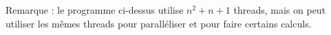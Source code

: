 \begin{exercice}[Parallélisation]
\begin{corrections}
    Remarque : le programme ci-dessus utilise $n^2 + n + 1$ threads, mais on peut utiliser les mêmes threads pour paralléliser et pour faire certains calculs.
  \end{corrections}
  
\end{exercice}

\endgroup
\endinput
